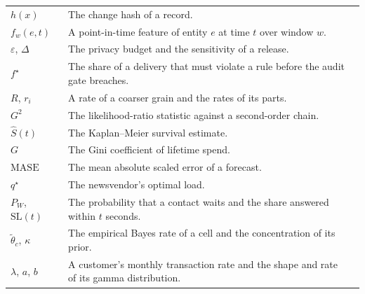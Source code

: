 {\begin{longtable}{@{}QVZ@{}}
$h(x)$ & The change hash of a record. &  \\
$f_w(e, t)$ & A point-in-time feature of entity $e$ at time $t$ over window $w$. &  \\
$\varepsilon$, $\Delta$ & The privacy budget and the sensitivity of a release. &  \\
$f^{\star}$ & The share of a delivery that must violate a rule before the audit gate breaches. &  \\
$R$, $r_i$ & A rate of a coarser grain and the rates of its parts. &  \\
$G^2$ & The likelihood-ratio statistic against a second-order chain. &  \\
$\hat S(t)$ & The Kaplan--Meier survival estimate. &  \\
$G$ & The Gini coefficient of lifetime spend. &  \\
$\mathrm{MASE}$ & The mean absolute scaled error of a forecast. &  \\
$q^{\star}$ & The newsvendor's optimal load. &  \\
$P_W$, $\mathrm{SL}(t)$ & The probability that a contact waits and the share answered within $t$ seconds. &  \\
$\tilde\theta_c$, $\kappa$ & The empirical Bayes rate of a cell and the concentration of its prior. &  \\
$\lambda$, $a$, $b$ & A customer's monthly transaction rate and the shape and rate of its gamma distribution. &  \\
\end{longtable}}
